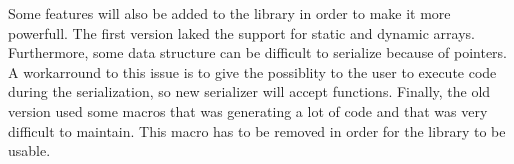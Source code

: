 Some features will also be added to the library in order to make it more
powerfull. The first version laked the support for static and dynamic arrays.
Furthermore, some data structure can be difficult to serialize because of
pointers. A workarround to this issue is to give the possiblity to the user to
execute code during the serialization, so new serializer will accept functions.
Finally, the old version used some macros that was generating a lot of code and
that was very difficult to maintain. This macro has to be removed in order for
the library to be usable.
